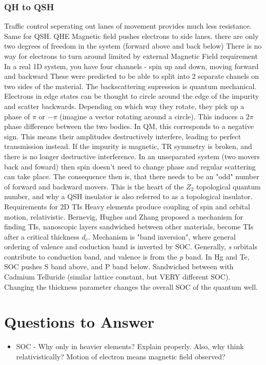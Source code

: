 \documentclass{article} %
\begin{document}
	\subsubsection{QH to QSH}
	\begin{outline}
	\1 Traffic control seperating out lanes of movement provides much less resistance. Same for QSH.
	\1 QHE Magnetic field pushes electrons to side lanes.
		\2 there are only two degrees of freedom in the system (forward above and back below)
		\2 There is no way for electrons to turn around
		\2 limited by external Magnetic Field requirement
	\1 In a real 1D system, you have four channels - spin up and down, moving forward and backward
		\2 These were predicted to be able to split into 2 separate chanels on two sides of the material. 
	\1 The backscattering supression is quantum mechanical.
		\2 Electrons in edge states can be thought to circle around the edge of the impurity and scatter backwards.
		\2 Depending on which way they rotate, they pick up a phase of $\pi$ or $-\pi$ (imagine a vector rotating around a circle). 
		\2 This induces a $2\pi$ phase difference between the two bodies. 
		\2 In QM, this corresponds to a negative sign. This means their amplitudes destructively interfere, leading to perfect transmission instead.
		\2 If the impurity is magnetic, TR symmetry is broken, and there is no longer destructive interference.
		\2 In an unseparated system (two movers back and foward) then spin doesn't need to change phase and regular scattering can take place.
		\2 The consequence then is, that there needs to be an "odd" number of forward and backward movers.
		\2 This is the heart of the $Z_2$ topological quantum number, and why a QSH insulator is also referred to as a topological insulator.
	\1 Requirements for 2D TIs
		\2 Heavy elements produce coupling of spin and orbital motion, relativistic.
	\1 Bernevig, Hughes and Zhang proposed a mechanism for finding TIs, nanoscopic layers sandwiched between other materials, become TIs after a critical thickness $d_c$. 
		\2 Mechanism is "band inversion", where general ordering of valence and coduction band is inverted by SOC.
		\2 Generally, \textit{s} orbitals contribute to conduction band, and valence is from the \textit{p} band.
		\2 In Hg and Te, SOC pushes S band above, and P band below.
		\2 Sandwiched between with Cadmium Telluride (similar lattice constant, but VERY different SOC).
		\2 Changing the thickness parameter changes the overall SOC of the quantum well. 
	\end{outline}


\section{Questions to Answer}
	\begin{itemize}
		\item SOC - Why only in heavier elements? Explain properly. Also, why think relativistically? Motion of electron means magnetic field observed?
	\end{itemize}



\end{document}
